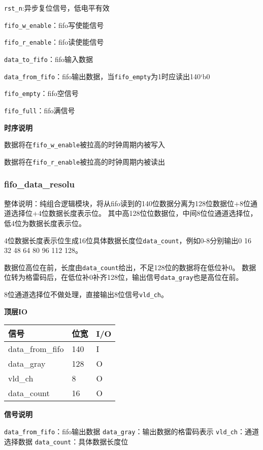 \documentclass[12pt,]{article}
\begin{document}
\texttt{rst\_n}:异步复位信号，低电平有效

\texttt{fifo\_w\_enable}：fifo写使能信号

\texttt{fifo\_r\_enable}：fifo读使能信号

\texttt{data\_to\_fifo}：fifo输入数据

\texttt{data\_from\_fifo}：fifo输出数据，当\texttt{fifo\_empty}为1时应读出140`b0

\texttt{fifo\_empty}：fifo空信号

\texttt{fifo\_full}：fifo满信号

\textbf{时序说明}

数据将在\texttt{fifo\_w\_enable}被拉高的时钟周期内被写入

数据将在\texttt{fifo\_r\_enable}被拉高的时钟周期内被读出

\hypertarget{fifo_data_resolu}{%
\subsubsection{fifo\_data\_resolu}\label{fifo_data_resolu}}

整体说明：纯组合逻辑模块，将从fifo读到的140位数据分离为128位数据位+8位通道选择位+4位数据长度表示位。
其中高128位位数据位，中间8位位通道选择位，低4位为数据长度表示位。

4位数据长度表示位生成16位具体数据长度位\texttt{data\_count}，例如0-8分别输出0
16 32 48 64 80 96 112 128。

数据位高位在前，长度由\texttt{data\_count}给出，不足128位的数据将在低位补0。
数据位转为格雷码后，在低位补0补齐128位，输出信号\texttt{data\_gray}也是高位在前。

8位通道选择位不做处理，直接输出8位信号\texttt{vld\_ch}。

\textbf{顶层IO}

\begin{longtable}[]{@{}lll@{}}
\toprule\noalign{}
信号 & 位宽 & I/O \\
\midrule\noalign{}
\endhead
\bottomrule\noalign{}
\endlastfoot
data\_from\_fifo & 140 & I \\
data\_gray & 128 & O \\
vld\_ch & 8 & O \\
data\_count & 16 & O \\
\end{longtable}

\textbf{信号说明}

\texttt{data\_from\_fifo}：fifo输出数据
\texttt{data\_gray}：输出数据的格雷码表示 \texttt{vld\_ch}：通道选择数据
\texttt{data\_count}：具体数据长度位
\end{document}
